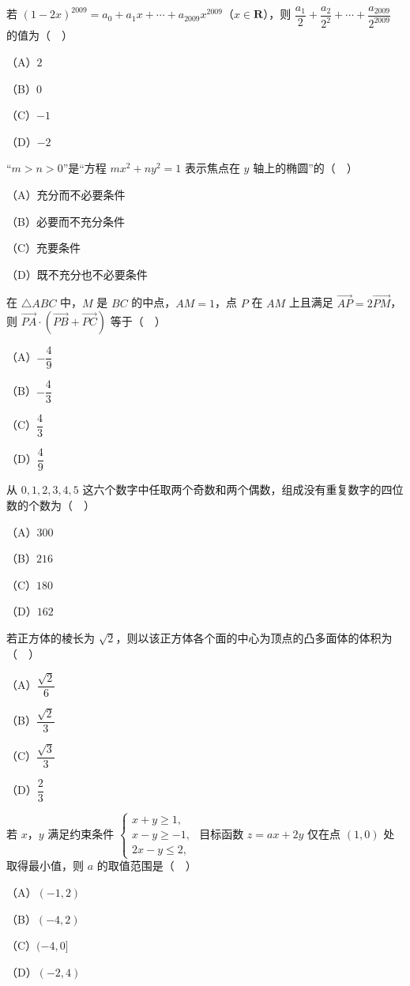 \begin{question}
若 $(1-2x)^{2009}=a_0+a_1x+\cdots+a_{2009}x^{2009}$（$x\in\mathbf R$），则 $\dfrac{a_1}2+\dfrac{a_2}{2^2}+\cdots+\dfrac{a_{2009}}{2^{2009}}$ 的值为（　）

（A）$2$

（B）$0$

（C）$-1$

（D）$-2$

\end{question}
\begin{question}
“$m>n>0$”是“方程 $mx^2+ny^2=1$ 表示焦点在 $y$ 轴上的椭圆”的（　）

（A）充分而不必要条件

（B）必要而不充分条件

（C）充要条件

（D）既不充分也不必要条件

\end{question}
\begin{question}
在 $\triangle ABC$ 中，$M$ 是 $BC$ 的中点，$AM=1$，点 $P$ 在 $AM$ 上且满足 $\overrightarrow{AP}=2\overrightarrow{PM}$，则 $\overrightarrow{PA}\cdot(\overrightarrow{PB}+\overrightarrow{PC})$ 等于（　）

（A）$-\dfrac49$

（B）$-\dfrac43$

（C）$\dfrac43$

（D）$\dfrac49$

\end{question}
\begin{question}
从 $0,1,2,3,4,5$ 这六个数字中任取两个奇数和两个偶数，组成没有重复数字的四位数的个数为（　）

（A）$300$

（B）$216$

（C）$180$

（D）$162$

\end{question}
\begin{question}
若正方体的棱长为 $\sqrt2$，则以该正方体各个面的中心为顶点的凸多面体的体积为（　）

（A）$\dfrac{\sqrt2}6$

（B）$\dfrac{\sqrt2}3$

（C）$\dfrac{\sqrt3}3$

（D）$\dfrac23$

\end{question}
\begin{question}
若 $x$，$y$ 满足约束条件 $\begin{cases}x+y\geqslant1,\\ x-y\geqslant-1,\\ 2x-y\leqslant2,\end{cases}$ 目标函数 $z=ax+2y$ 仅在点 $(1,0)$ 处取得最小值，则 $a$ 的取值范围是（　）

（A）$(-1,2)$

（B）$(-4,2)$

（C）$(-4,0]$

（D）$(-2,4)$

\end{question}
